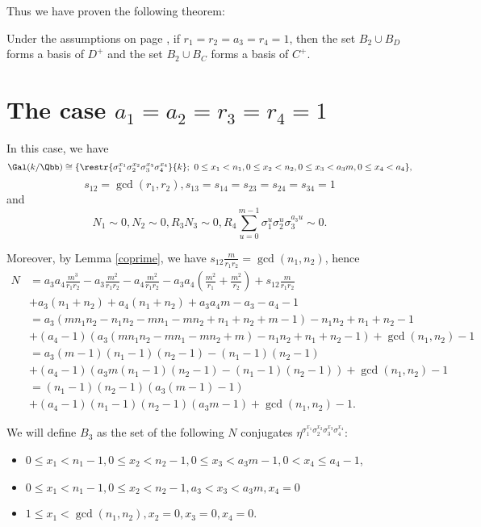 Thus we have proven the following theorem:
\begin{theorem}
Under the assumptions on page \pageref{assum}, if $r_1=r_2=a_3=r_4=1$, then the set $B_{2}\cup B_D$ forms a basis of $D^+$ and the set $B_{2}\cup B_C$ forms a basis of $C^+$.
\end{theorem}
\section{The case $a_1=a_2=r_3=r_4=1$}
In this case, we have
$$\Gal(k/\Qbb)\cong
 \{\restr{\sigma_1^{x_1}\sigma_2^{x_2}\sigma_3^{x_3}\sigma_4^{x_4}}{k};~  0\leq x_1<n_1, 0\leq x_2<n_2, 0\leq x_3<a_3m,0\leq x_4<a_4\},$$
  $$s_{12}=\gcd(r_1,r_2),s_{13}=s_{14}=s_{23}=s_{24}=s_{34}=1$$
 and $$N_1\sim 0, N_2\sim 0, R_3N_3 \sim 0, R_4 \sum_{u=0}^{m-1}\sigma_1^u\sigma_2^u\sigma_3^{a_3u} \sim 0.$$

Moreover, by Lemma \ref{coprime}, we have $s_{12}\frac{m}{r_1r_2}=\gcd(n_1,n_2)$, hence
\begin{align*}
N&=a_3a_4\frac{m^3}{r_1r_2}-a_3\frac{m^2}{r_1r_2}-a_4\frac{m^2}{r_1r_2}-a_3a_4\left(\frac{m^2}{r_1}+\frac{m^2}{r_2}\right)+s_{12}\frac{m}{r_1r_2}\\
&+a_3(n_1+n_2)+a_4(n_1+n_2)+a_3a_4m-a_3-a_4-1\\
&=a_3\left(mn_1n_2-n_1n_2 -mn_1-mn_2+n_1+n_2+m-1\right)-n_1n_2+n_1+n_2-1\\
&+(a_4-1)(a_3\left(mn_1n_2 -mn_1-mn_2+m\right)-n_1n_2+n_1+n_2-1)+\gcd(n_1,n_2)-1\\
&=a_3\left(m-1\right)\left(n_1-1\right)\left(n_2-1\right)-\left(n_1-1\right)\left(n_2-1\right)\\
&+(a_4-1)\left(a_3m\left(n_1-1\right)\left(n_2-1\right)-\left(n_1-1\right)\left(n_2-1\right)\right)+\gcd(n_1,n_2)-1\\
&=(n_1-1)(n_2-1)(a_3(m-1)-1)\\
&+(a_4-1)(n_1-1)(n_2-1)(a_3m-1)+\gcd(n_1,n_2)-1.
\end{align*}

We will define $B_3$ as the set of the following $N$ conjugates $\eta^{\sigma_1^{x_1}\sigma_2^{x_2}\sigma_3^{x_3}\sigma_4^{x_4}}$:
\begin{itemize}
\item $0\leq x_1<n_1-1, 0\leq x_2<n_2-1, 0\leq x_3<a_3m-1, 0<x_4\leq a_4-1$,
\item $0\leq x_1<n_1-1, 0\leq x_2<n_2-1, a_3<x_3<a_3m, x_4=0$
\item $1\leq x_1<\gcd(n_1,n_2) , x_2=0, x_3=0, x_4=0$.
\end{itemize}

